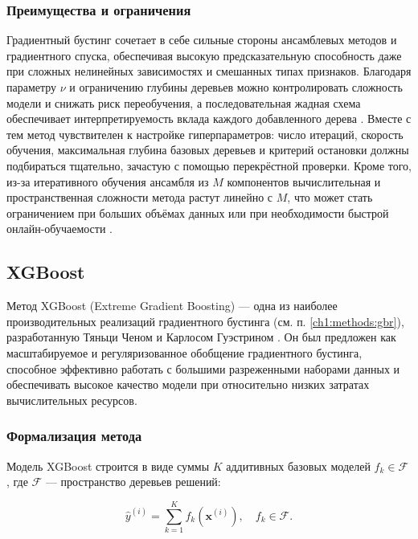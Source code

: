 \subsubsection{Преимущества и ограничения}

Градиентный бустинг сочетает в себе сильные стороны ансамблевых методов и градиентного спуска, обеспечивая высокую предсказательную способность даже при сложных нелинейных зависимостях и смешанных типах признаков. Благодаря параметру  $\nu$ и ограничению глубины деревьев можно контролировать сложность модели и снижать риск переобучения, а последовательная жадная схема обеспечивает интерпретируемость вклада каждого добавленного дерева \cite{hastie2009elements}. Вместе с тем метод чувствителен к настройке гиперпараметров: число итераций, скорость обучения, максимальная глубина базовых деревьев и критерий остановки должны подбираться тщательно, зачастую с помощью перекрёстной проверки. Кроме того, из-за итеративного обучения ансамбля из $M$ компонентов вычислительная и пространственная сложности метода растут линейно с $M$, что может стать ограничением при больших объёмах данных или при необходимости быстрой онлайн-обучаемости \cite{hastie2009elements}.

\subsection{XGBoost}

Метод XGBoost (Extreme Gradient Boosting) --- одна из наиболее производительных реализаций градиентного бустинга (см. п. \ref{ch1:methods:gbr}), разработанную Тяньци Ченом и Карлосом Гуэстрином \cite{Chen2016}. Он был предложен как масштабируемое и регуляризованное обобщение градиентного бустинга, способное эффективно работать с большими разреженными наборами данных и обеспечивать высокое качество модели при относительно низких затратах вычислительных ресурсов.

\subsubsection{Формализация метода}

Модель XGBoost строится в виде суммы $K$ аддитивных базовых моделей $f_k \in \mathcal{F}$, где $\mathcal{F}$ — пространство деревьев решений:

\begin{equation}
\hat{y}^{(i)} = \sum_{k=1}^{K} f_k(\mathbf{x}^{(i)}), \quad f_k \in \mathcal{F}.
\end{equation}

